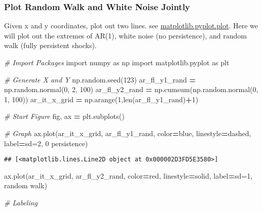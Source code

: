 \documentclass[
]{book}
\newenvironment{Shaded}{\begin{snugshade}}{\end{snugshade}}
\newcommand{\BuiltInTok}[1]{#1}
\newcommand{\CommentTok}[1]{\textcolor[rgb]{0.56,0.35,0.01}{\textit{#1}}}
\newcommand{\DecValTok}[1]{\textcolor[rgb]{0.00,0.00,0.81}{#1}}
\newcommand{\ImportTok}[1]{#1}
\newcommand{\NormalTok}[1]{#1}
\newcommand{\OperatorTok}[1]{\textcolor[rgb]{0.81,0.36,0.00}{\textbf{#1}}}
\newcommand{\StringTok}[1]{\textcolor[rgb]{0.31,0.60,0.02}{#1}}
\begin{document}
\hypertarget{plot-random-walk-and-white-noise-jointly}{%
\subsubsection{Plot Random Walk and White Noise Jointly}\label{plot-random-walk-and-white-noise-jointly}}

Given x and y coordinates, plot out two lines. see \href{https://matplotlib.org/2.1.1/api/_as_gen/matplotlib.pyplot.plot.html}{matplotlib.pyplot.plot}. Here we will plot out the extremes of AR(1), white noise (no persistence), and random walk (fully persistent shocks).

\begin{Shaded}
\begin{Highlighting}[]
\CommentTok{\# Import Packages}
\ImportTok{import}\NormalTok{ numpy }\ImportTok{as}\NormalTok{ np}
\ImportTok{import}\NormalTok{ matplotlib.pyplot }\ImportTok{as}\NormalTok{ plt}

\CommentTok{\# Generate X and Y}
\NormalTok{np.random.seed(}\DecValTok{123}\NormalTok{)}
\NormalTok{ar\_fl\_y1\_rand }\OperatorTok{=}\NormalTok{ np.random.normal(}\DecValTok{0}\NormalTok{, }\DecValTok{2}\NormalTok{, }\DecValTok{100}\NormalTok{)}
\NormalTok{ar\_fl\_y2\_rand }\OperatorTok{=}\NormalTok{ np.cumsum(np.random.normal(}\DecValTok{0}\NormalTok{, }\DecValTok{1}\NormalTok{, }\DecValTok{100}\NormalTok{))}
\NormalTok{ar\_it\_x\_grid }\OperatorTok{=}\NormalTok{ np.arange(}\DecValTok{1}\NormalTok{,}\BuiltInTok{len}\NormalTok{(ar\_fl\_y1\_rand)}\OperatorTok{+}\DecValTok{1}\NormalTok{)}

\CommentTok{\# Start Figure}
\NormalTok{fig, ax }\OperatorTok{=}\NormalTok{ plt.subplots()}

\CommentTok{\# Graph}
\NormalTok{ax.plot(ar\_it\_x\_grid, ar\_fl\_y1\_rand,}
\NormalTok{                     color}\OperatorTok{=}\StringTok{\textquotesingle{}blue\textquotesingle{}}\NormalTok{, linestyle}\OperatorTok{=}\StringTok{\textquotesingle{}dashed\textquotesingle{}}\NormalTok{,}
\NormalTok{                     label}\OperatorTok{=}\StringTok{\textquotesingle{}sd=2, 0 persistence\textquotesingle{}}\NormalTok{)}
\end{Highlighting}
\end{Shaded}

\begin{verbatim}
## [<matplotlib.lines.Line2D object at 0x000002D3FD5E3580>]
\end{verbatim}

\begin{Shaded}
\begin{Highlighting}[]
\NormalTok{ax.plot(ar\_it\_x\_grid, ar\_fl\_y2\_rand,}
\NormalTok{                     color}\OperatorTok{=}\StringTok{\textquotesingle{}red\textquotesingle{}}\NormalTok{, linestyle}\OperatorTok{=}\StringTok{\textquotesingle{}solid\textquotesingle{}}\NormalTok{,}
\NormalTok{                     label}\OperatorTok{=}\StringTok{\textquotesingle{}sd=1, random walk\textquotesingle{}}\NormalTok{)}
                     
\CommentTok{\# Labeling}
\end{Highlighting}
\end{Shaded}
\end{document}
